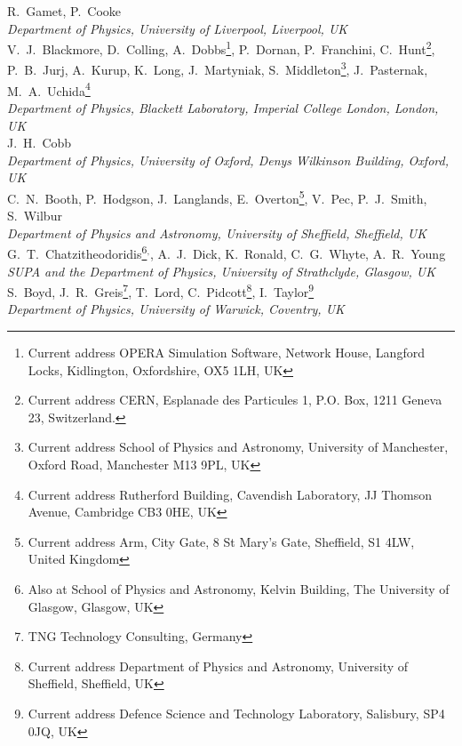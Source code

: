 R.~Gamet, P.~Cooke
\\{\it
Department of Physics, University of Liverpool, Liverpool, UK
}\\

V.~J.~Blackmore, D.~Colling, A.~Dobbs\footnote{Current address OPERA Simulation Software, Network House, Langford Locks, Kidlington, Oxfordshire, OX5 1LH, UK}, P.~Dornan, P.~Franchini, C.~Hunt\footnote{Current address CERN, Esplanade des Particules 1, P.O. Box, 1211 Geneva 23, Switzerland.}, P.~B.~Jurj, A.~Kurup, K.~Long, J.~Martyniak,  S.~Middleton\footnote{Current address School of Physics and Astronomy, University of Manchester, Oxford Road, Manchester M13 9PL, UK}, J.~Pasternak, M.~A.~Uchida\footnote{Current address Rutherford Building, Cavendish Laboratory, JJ Thomson Avenue, Cambridge CB3 0HE, UK}
\\{\it
Department of Physics, Blackett Laboratory, Imperial College London, London, UK
}\\

J.~H.~Cobb
\\{\it
Department of Physics, University of Oxford, Denys Wilkinson Building, Oxford, UK
}\\

C.~N.~Booth, P.~Hodgson, J.~Langlands, E.~Overton\footnote{Current address Arm, City Gate, 8 St Mary's Gate, Sheffield, S1 4LW, United Kingdom}, V.~Pec,  P.~J.~Smith, S.~Wilbur
\\{\it
Department of Physics and Astronomy, University of Sheffield, Sheffield, UK
}\\

G.~T.~Chatzitheodoridis\footnote{Also at School of Physics and Astronomy, Kelvin Building, The University of Glasgow, Glasgow, UK}$^,$\footnotemark, A.~J.~Dick\footnotemark[\value{footnote}],  K.~Ronald\footnotemark[\value{footnote}], C.~G.~Whyte\footnotemark[\value{footnote}], A.~R.~Young\footnotemark[\value{footnote}]
\\{\it
SUPA and the Department of Physics, University of Strathclyde, Glasgow, UK
}\\

S.~Boyd,  J.~R.~Greis\footnote{TNG Technology Consulting, Germany}, T.~Lord, C.~Pidcott\footnote{Current address Department of Physics and Astronomy, University of Sheffield, Sheffield, UK}, I.~Taylor\footnote{Current address Defence Science and Technology Laboratory, Salisbury, SP4 0JQ, UK}
\\{\it
Department of Physics, University of Warwick, Coventry, UK
}\\


